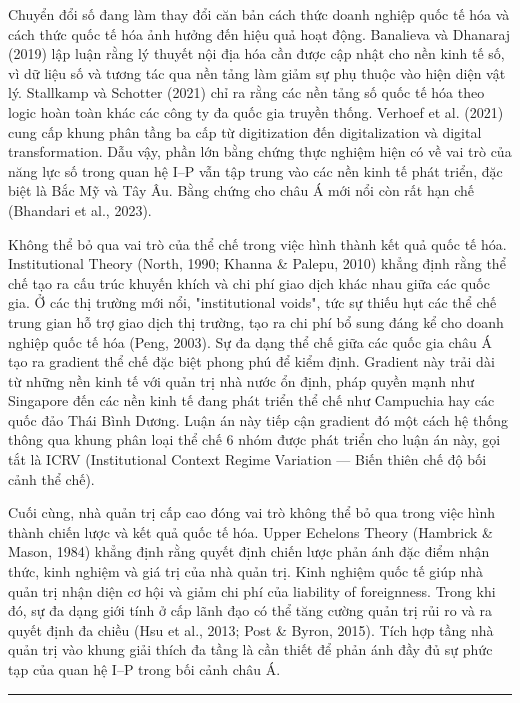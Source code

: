 \documentclass[12pt,a4paper]{article}
\begin{document}
Chuyển đổi số đang làm thay đổi căn bản cách thức doanh nghiệp quốc tế
hóa và cách thức quốc tế hóa ảnh hưởng đến hiệu quả hoạt động. Banalieva
và Dhanaraj (2019) lập luận rằng lý thuyết nội địa hóa cần được cập nhật
cho nền kinh tế số, vì dữ liệu số và tương tác qua nền tảng làm giảm sự
phụ thuộc vào hiện diện vật lý. Stallkamp và Schotter (2021) chỉ ra rằng
các nền tảng số quốc tế hóa theo logic hoàn toàn khác các công ty đa
quốc gia truyền thống. Verhoef et al. (2021) cung cấp khung phân tầng ba
cấp từ digitization đến digitalization và digital transformation. Dẫu
vậy, phần lớn bằng chứng thực nghiệm hiện có về vai trò của năng lực số
trong quan hệ I--P vẫn tập trung vào các nền kinh tế phát triển, đặc
biệt là Bắc Mỹ và Tây Âu. Bằng chứng cho châu Á mới nổi còn rất hạn chế
(Bhandari et al., 2023).

Không thể bỏ qua vai trò của thể chế trong việc hình thành kết quả quốc
tế hóa. Institutional Theory (North, 1990; Khanna \& Palepu, 2010) khẳng
định rằng thể chế tạo ra cấu trúc khuyến khích và chi phí giao dịch khác
nhau giữa các quốc gia. Ở các thị trường mới nổi, "institutional voids",
tức sự thiếu hụt các thể chế trung gian hỗ trợ giao dịch thị trường, tạo
ra chi phí bổ sung đáng kể cho doanh nghiệp quốc tế hóa (Peng, 2003). Sự
đa dạng thể chế giữa các quốc gia châu Á tạo ra gradient thể chế đặc
biệt phong phú để kiểm định. Gradient này trải dài từ những nền kinh tế
với quản trị nhà nước ổn định, pháp quyền mạnh như Singapore đến các nền
kinh tế đang phát triển thể chế như Campuchia hay các quốc đảo Thái Bình
Dương. Luận án này tiếp cận gradient đó một cách hệ thống thông qua
khung phân loại thể chế 6 nhóm được phát triển cho luận án này, gọi tắt
là ICRV (Institutional Context Regime Variation --- Biến thiên chế độ
bối cảnh thể chế).

Cuối cùng, nhà quản trị cấp cao đóng vai trò không thể bỏ qua trong việc
hình thành chiến lược và kết quả quốc tế hóa. Upper Echelons Theory
(Hambrick \& Mason, 1984) khẳng định rằng quyết định chiến lược phản ánh
đặc điểm nhận thức, kinh nghiệm và giá trị của nhà quản trị. Kinh nghiệm
quốc tế giúp nhà quản trị nhận diện cơ hội và giảm chi phí của liability
of foreignness. Trong khi đó, sự đa dạng giới tính ở cấp lãnh đạo có thể
tăng cường quản trị rủi ro và ra quyết định đa chiều (Hsu et al., 2013;
Post \& Byron, 2015). Tích hợp tầng nhà quản trị vào khung giải thích đa
tầng là cần thiết để phản ánh đầy đủ sự phức tạp của quan hệ I--P trong
bối cảnh châu Á.

\begin{center}\rule{0.5\linewidth}{0.5pt}\end{center}
\end{document}
